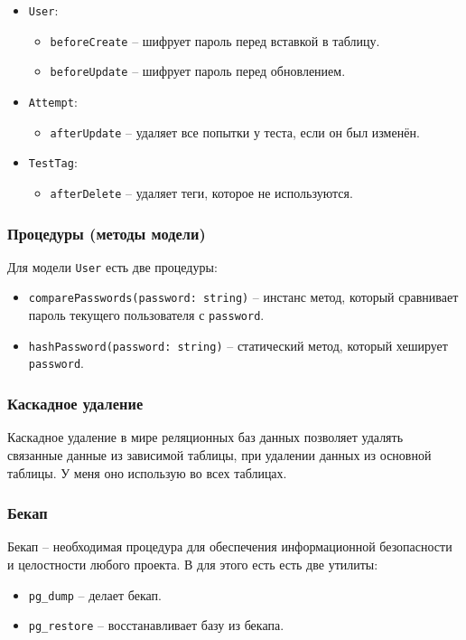 \begin{itemize}
    \item \texttt{User}: \begin{itemize}
        \item \texttt{beforeCreate} -- шифрует пароль перед вставкой в таблицу.
        \item \texttt{beforeUpdate} -- шифрует пароль перед обновлением.
    \end{itemize}
    \item \texttt{Attempt}: \begin{itemize}
        \item \texttt{afterUpdate} -- удаляет все попытки у теста, если он был изменён.
    \end{itemize}
    \item \texttt{TestTag}: \begin{itemize}
        \item \texttt{afterDelete} -- удаляет теги, которое не используются.
    \end{itemize}
\end{itemize}

\subsubsection{Процедуры (методы модели)}
Для модели \texttt{User} есть две процедуры:
\begin{itemize}
    \item \texttt{comparePasswords(password: string)} -- инстанс метод, который сравнивает пароль текущего пользователя с \texttt{password}.
    \item \texttt{hashPassword(password: string)} -- статический метод, который хеширует \texttt{password}.
\end{itemize}

\subsubsection{Каскадное удаление}
Каскадное удаление в мире реляционных баз данных позволяет удалять связанные данные из зависимой таблицы, при удалении данных из основной таблицы. У меня оно использую во всех таблицах.

\subsubsection{Бекап}
Бекап -- необходимая процедура для обеспечения информационной безопасности и целостности любого проекта. В \textcite{postgres} для этого есть есть две утилиты:
\begin{itemize}
    \item \texttt{pg_dump} -- делает бекап.
    \item \texttt{pg_restore} -- восстанавливает базу из бекапа.
\end{itemize}

